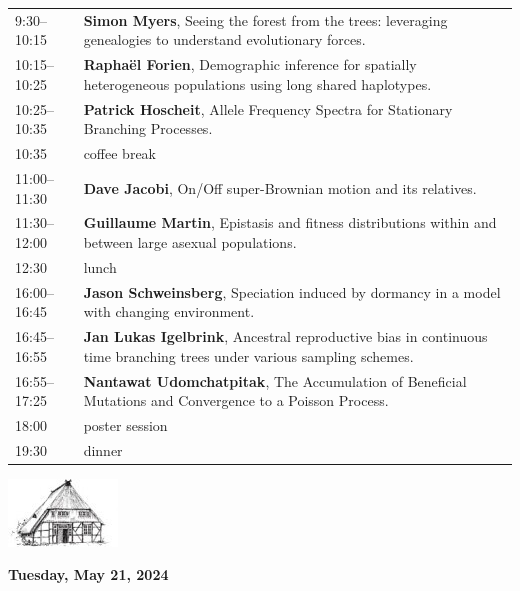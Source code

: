 \documentclass[12pt,a4paper]{article}
\newcommand{\Kopf}{%
\begin{center}%
\includegraphics[width=.2\textwidth]{logo-tsh}\\[2ex]
\end{center}
}
\begin{document}
\begin{tabular}{@{}l p{}@{}}
%
9:30--10:15 &  \textbf{Simon Myers}, 
                \sloppy Seeing the forest from the trees: leveraging \mbox{genealogies} to understand evolutionary forces. \\ 
10:15--10:25 &  \textbf{Raphaël Forien},
                Demographic inference for spatially heterogeneous populations using long shared haplotypes. \\ 
10:25--10:35 &  \textbf{Patrick Hoscheit},
                Allele Frequency Spectra for Stationary Branching Processes. \\ 
10:35 & coffee break  \\  
11:00--11:30 &  \textbf{Dave Jacobi}, 
                On/Off super-Brownian motion and its relatives. \\
11:30--12:00 & \textbf{Guillaume Martin}, 
                Epistasis and fitness distributions within and between large asexual populations. \\
12:30 & lunch  \\  
16:00--16:45 & \textbf{Jason Schweinsberg}, 
                Speciation induced by dormancy in a model with changing environment.\\ 
16:45--16:55 & \textbf{Jan Lukas Igelbrink}, 
                Ancestral reproductive bias in continuous time branching trees under various sampling schemes.  \\
16:55--17:25 & \textbf{Nantawat Udomchatpitak}, 
                The Accumulation of Beneficial Mutations and Convergence to a Poisson Process. \\
18:00 & poster session \\
19:30 & dinner 
\end{tabular}

\newpage

\Kopf
\vspace*{.75cm}

\textbf{\Large Tuesday, May 21, 2024}\medskip
\end{document}
